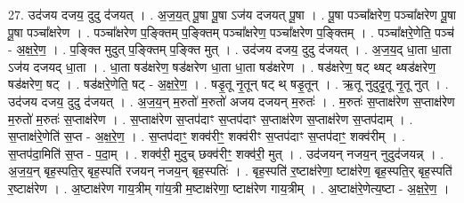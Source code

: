\documentclass[17pt]{extarticle}
\begin{document}
27. उद॑जय दजय॒ दुदु द॑जयत् । . अ॒ज॒य॒त् पू॒षा पू॒षा ऽज॑य दजयत् पू॒षा । . पू॒षा पञ्चा᳚क्षरेण॒ पञ्चा᳚क्षरेण पू॒षा पू॒षा पञ्चा᳚क्षरेण । . पञ्चा᳚क्षरेण प॒ङ्क्तिम् प॒ङ्क्तिम् पञ्चा᳚क्षरेण॒ 
पञ्चा᳚क्षरेण प॒ङ्क्तिम् । . पञ्चा᳚क्षरे॒णेति॒ पञ्च॑ - अ॒क्ष॒रे॒ण॒ । . प॒ङ्क्ति मुदुत् प॒ङ्क्तिम् प॒ङ्क्ति मुत् । . उद॑जय दजय॒ दुदु द॑जयत् । . अ॒ज॒य॒द् धा॒ता धा॒ता ऽज॑य दजयद् धा॒ता । . धा॒ता षड॑क्षरेण॒ षड॑क्षरेण धा॒ता धा॒ता षड॑क्षरेण । . षड॑क्षरेण॒ षट् थ्षट् थ्षड॑क्षरेण॒ षड॑क्षरेण॒ षट् । . षड॑क्षरे॒णेति॒ षट् - अ॒क्ष॒रे॒ण॒ । . षडृ॒तू नृ॒तून् षट् थ् षडृ॒तून् । . ऋ॒तू नुदुदृ॒तू नृ॒तू नुत् । . उद॑जय दजय॒ दुदु द॑जयत् । . अ॒ज॒य॒न् म॒रुतो॑ म॒रुतो॑ अजय दजयन् म॒रुतः॑ । . म॒रुतः॑ स॒प्ताक्ष॑रेण स॒प्ताक्ष॑रेण म॒रुतो॑ म॒रुतः॑ स॒प्ताक्ष॑रेण । . स॒प्ताक्ष॑रेण स॒प्तप॑दाꣳ स॒प्तप॑दाꣳ स॒प्ताक्ष॑रेण स॒प्ताक्ष॑रेण स॒प्तप॑दाम् । . स॒प्ताक्ष॑रे॒णेति॑ स॒प्त - अ॒क्ष॒रे॒ण॒ । . स॒प्तप॑दाꣳ॒॒ शक्व॑रीꣳ॒॒ शक्व॑रीꣳ स॒प्तप॑दाꣳ स॒प्तप॑दाꣳ॒॒ शक्व॑रीम् । . स॒प्तप॑दा॒मिति॑ स॒प्त - प॒दा॒म् । . शक्व॑री॒ मुदुच् छक्व॑रीꣳ॒॒ शक्व॑री॒ मुत् । . उद॑जयन् नजय॒न् नुदुद॑जयन्न् । . अ॒ज॒य॒न् बृह॒स्पति॒र् बृह॒स्पति॑ रजयन् नजय॒न् बृह॒स्पतिः॑ । . बृह॒स्पति॑ र॒ष्टाक्ष॑रेणा॒ ष्टाक्ष॑रेण॒ बृह॒स्पति॒र् बृह॒स्पति॑ र॒ष्टाक्ष॑रेण । . अ॒ष्टाक्ष॑रेण गाय॒त्रीम् गा॑य॒त्री म॒ष्टाक्ष॑रेणा॒ ष्टाक्ष॑रेण गाय॒त्रीम् । . अ॒ष्टाक्ष॑रे॒णेत्य॒ष्टा - अ॒क्ष॒रे॒ण॒ । \newline
\end{document}
